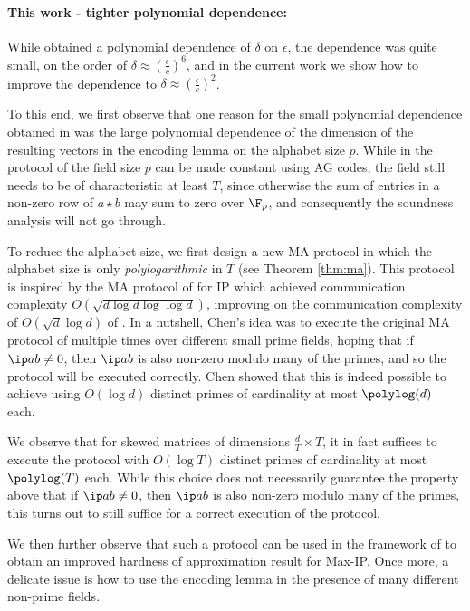 \documentclass[11pt]{article}
\begin{document}
\paragraph{This work - tighter polynomial dependence:} While \cite{CW19} obtained a polynomial dependence of $\delta$ on $\epsilon$, the dependence was quite small, on the order of $\delta \approx  (\frac \epsilon c)^6$, and in the current work we show how to improve the dependence to $\delta \approx (\frac  \epsilon c)^2$.

To this end, we first observe that one reason for the small polynomial dependence obtained in \cite{CW19} was the large polynomial dependence of the dimension of the resulting vectors in the encoding lemma on the alphabet size $p$. While in the protocol of \cite{Rub18} the field size $p$ can be made constant using AG codes, the field still needs to be of characteristic at least $T$, since otherwise the sum of entries in a non-zero row of $a \star b$ may sum to zero over $\F_p$, and consequently the soundness analysis will not go through.

To reduce the alphabet size, we first design a new MA protocol in which the alphabet size is only \emph{polylogarithmic} in $T$ (see Theorem \ref{thm:ma}).
This protocol is inspired by the MA protocol of \cite{Che18} for IP which achieved communication complexity $O(\sqrt{d \log d\log \log d})$, improving on the communication complexity of $O(\sqrt{d} \log d)$ of \cite{AW09}.
In a nutshell, Chen's idea was to execute the original MA protocol of  \cite{AW09} multiple times over different small prime fields, hoping that if $\ip a b \neq 0$, then $\ip a b$ is also non-zero modulo many of the primes, and so the protocol will be executed correctly.
Chen showed that this is indeed possible to achieve using $O(\log d)$ distinct primes of cardinality at most $\polylog(d)$ each.

We observe that for skewed matrices of  dimensions $\frac d T \times T$, it in fact suffices to execute the protocol with $O(\log T)$ distinct primes of cardinality at most $\polylog(T)$ each. While this choice does not necessarily guarantee the property above that if $\ip a b \neq 0$, then $\ip a b$ is also non-zero modulo many of the primes, this turns out to still suffice for a correct execution of the protocol. 

We then further observe that such a protocol can be used in the framework of \cite{CW19} to obtain an improved hardness of approximation result for Max-IP. Once more, a delicate issue is how to use the encoding lemma in the presence of many different non-prime fields.   
\end{document}
